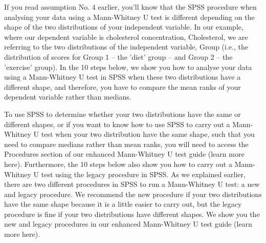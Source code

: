 \documentclass[]{article}
\begin{document}
If you read assumption No. 4 earlier, you'll know that the SPSS procedure when analysing your data using a Mann-Whitney U test is different depending on the shape of the two distributions of your independent variable. In our example, where our dependent variable is cholesterol concentration, Cholesterol, we are referring to the two distributions of the independent variable, Group (i.e., the distribution of scores for Group 1 – the 'diet' group – and Group 2 – the 'exercise' group). In the 10 steps below, we show you how to analyse your data using a Mann-Whitney U test in SPSS when these two distributions have a different shape, and therefore, you have to compare the mean ranks of your dependent variable rather than medians.

To use SPSS to determine whether your two distributions have the same or different shapes, or if you want to know how to use SPSS to carry out a Mann-Whitney U test when your two distribution have the same shape, such that you need to compare medians rather than mean ranks, you will need to access the Procedures section of our enhanced Mann-Whitney U test guide (learn more here). Furthermore, the 10 steps below also show you how to carry out a Mann-Whitney U test using the legacy procedure in SPSS. As we explained earlier, there are two different procedures in SPSS to run a Mann-Whitney U test: a new and legacy procedure. We recommend the new procedure if your two distributions have the same shape because it is a little easier to carry out, but the legacy procedure is fine if your two distributions have different shapes. We show you the new and legacy procedures in our enhanced Mann-Whitney U test guide (learn more here).
\end{document}
